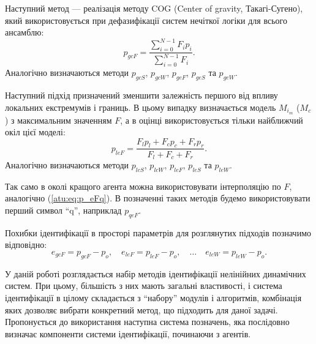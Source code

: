 \documentclass[a4paper,13pt]{atuaref}
\begin{document}
Наступний метод --- реалізація методу COG (Center of gravity, Такагі-Сугено),
який використовується при дефазифікації систем нечіткої логіки для всього
ансамблю:
%
\begin{equation}
  p_{gcF}
  =
  \frac{\sum\limits_{i=0}^{N-1} F_{i} p_{i}}
       {\sum\limits_{i=0}^{N-1} F_{i} }
  .
  \label{atu:eq:p_gcF}
\end{equation}
%
Аналогічно визначаються методи
$p_{gcS}$,
$p_{gcW}$,
$p_{geF}$,
$p_{geS}$ та
$p_{geW}$.


Наступний підхід призначений зменшити залежність першого від впливу локальних
екстремумів і границь. В цьому випадку визначається модель $M_{i_{m}}$ ($M_{c}$) з
максимальним значенням $F$, а в оцінці використовується тільки найближчий
окіл цієї моделі:
%
\begin{equation}
  p_{leF}
  =
  \frac{ F_{l} p_{l} + F_{c} p_{c} + F_{r} p_{r} }
       { F_{l}       + F_{c}       + F_{r}       }
  .
  \label{atu:eq:p_lcFl}
\end{equation}
%
Аналогічно визначаються методи
$p_{lcS}$,
$p_{lcW}$,
$p_{leF}$,
$p_{leS}$ та
$p_{leW}$.


Так само в околі кращого агента можна використовувати інтерполяцію по
$F$, аналогічно (\ref{atu:eq:p_eFq}). В позначенні таких методів будемо
використовувати перший символ ``q'', наприклад $p_{qeF}$.

Похибки ідентифікації в просторі параметрів для розглянутих підходів позначимо відповідно:
%
\begin{equation}
  e_{gcF} = p_{gcF} - p_o,
  \quad
  e_{leF} = p_{leF} - p_o,
  \quad
  \ldots
  \quad
  e_{leW} = p_{leW} - p_o.
  \label{atu:eq:e_xx}
\end{equation}
%

У даній роботі розглядається набір методів ідентифікації нелінійних динамічних
систем. При цьому, більшість з них мають загальні властивості, і система
ідентифікації в цілому складається з ``набору'' модулів і алгоритмів,
комбінація яких дозволяє вибрати конкретний метод, що підходить для даної
задачі.
Пропонується до використання наступна система позначень, яка послідовно визначає
компоненти системи ідентифікації, починаючи з агентів.
\end{document}
